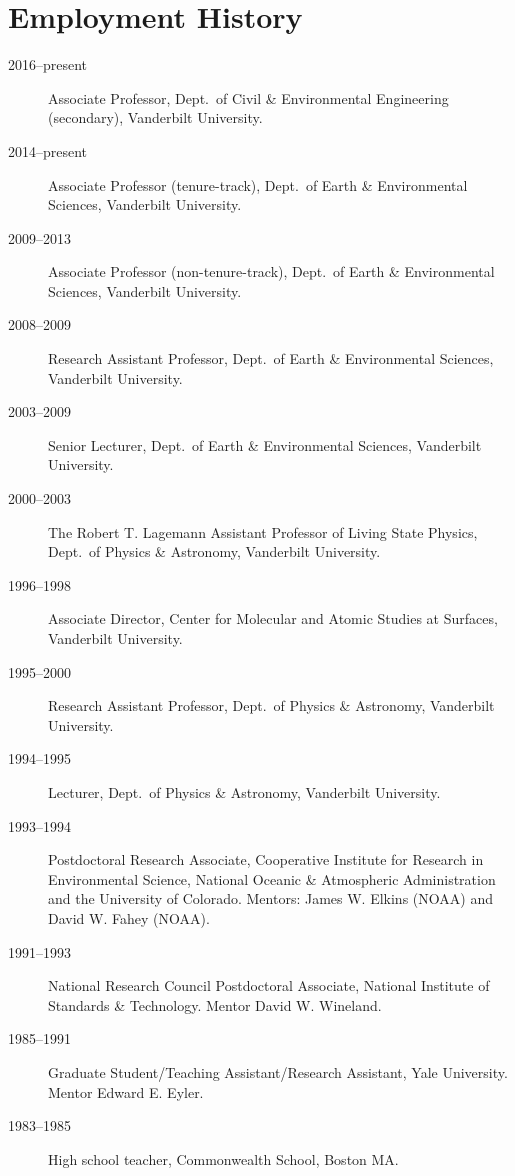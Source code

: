 \documentclass[10pt]{article}
\begin{document}
\section{Employment History}
\begin{description}
\item[2016--present] Associate Professor, Dept.\ of Civil \& Environmental Engineering (secondary), Vanderbilt University.
\item[2014--present] Associate Professor (tenure-track), Dept.\ of Earth \& Environmental Sciences, Vanderbilt University.
\item[2009--2013] Associate Professor (non-tenure-track), Dept.\ of Earth \& Environmental Sciences, Vanderbilt University.
\item[2008--2009] Research Assistant Professor, Dept.\ of Earth \& Environmental Sciences, Vanderbilt University.
\item[2003--2009] Senior Lecturer, Dept.\ of Earth \& Environmental Sciences, Vanderbilt University.
\item[2000--2003] The Robert T. Lagemann Assistant Professor of Living State Physics, Dept.\ of Physics \& Astronomy, Vanderbilt University.
\item[1996--1998] Associate Director, Center for Molecular and Atomic Studies at Surfaces, Vanderbilt University.
\item[1995--2000] Research Assistant Professor, Dept.\ of Physics \& Astronomy, Vanderbilt University.
\item[1994--1995] Lecturer, Dept.\ of Physics \& Astronomy, Vanderbilt University.
\item[1993--1994] Postdoctoral Research Associate, Cooperative Institute for Research in Environmental Science, National Oceanic \& Atmospheric Administration and the University of Colorado. Mentors: James W. Elkins (NOAA) and David W. Fahey (NOAA).
\item[1991--1993] National Research Council Postdoctoral Associate, National Institute of Standards \& Technology. Mentor David W. Wineland.
\item[1985--1991] Graduate Student/Teaching Assistant/Research Assistant, Yale University. Mentor Edward E. Eyler.
\item[1983--1985] High school teacher, Commonwealth School, Boston MA.
\end{description}
\end{document}
